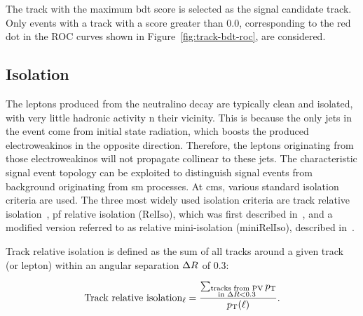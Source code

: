 The track with the maximum \gls{bdt} score is selected as the signal candidate track. Only events with a track with a score greater than 0.0, corresponding to the red dot in the ROC curves shown in Figure~\ref{fig:track-bdt-roc}, are considered.

\clearpage
\subsection{Isolation}
\label{sec:isolation}

The leptons produced from the neutralino decay \neuttdecay are typically clean and isolated, with very little hadronic activity n their vicinity. This is because the only jets in the event come from initial state radiation, which boosts the produced electroweakinos in the opposite direction. Therefore, the leptons originating from those electroweakinos will not propagate collinear to these jets. The characteristic signal event topology can be exploited to distinguish signal events from background originating from \gls{sm} processes. At \gls{cms}, various standard isolation criteria are used. The three most widely used isolation criteria are track relative isolation~\cite{muon-pog-recommendations}, \gls{pf} relative isolation ($\mathrm{RelIso}$), which was first described in~\cite{Chatrchyan_2011}, and a modified version referred to as relative mini-isolation ($\mathrm{miniRelIso}$), described in~\cite{Rehermann_2011}.

Track relative isolation is defined as the \pt sum of all tracks around a given track (or lepton) within an angular separation $\Delta R$ of 0.3:

\begin{equation}
\text{Track relative isolation}_\ell = \frac{ \sum_{\substack{\text{tracks from PV}\\ \text{in } \Delta R<0.3}}p_{\mathrm{T}}}{ p_{\mathrm{T}}(\ell) }.
\end{equation}


